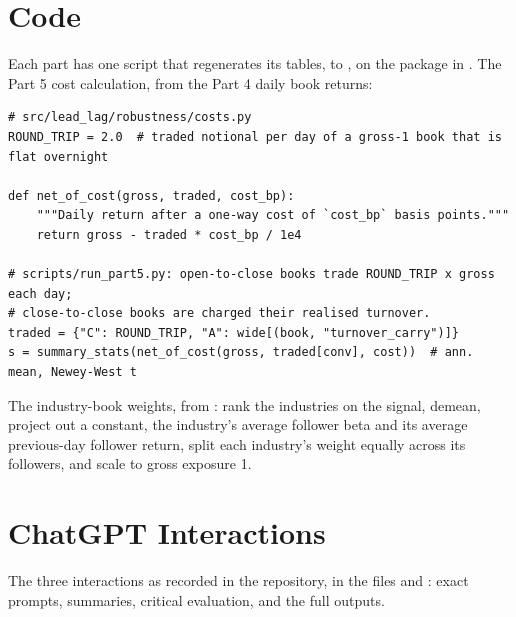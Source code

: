 \clearpage
\section{Code}\label{app:code}

Each part has one script that regenerates its tables,
 to , on the package in
. The Part 5 cost calculation, from the Part 4 daily book
returns:

\begin{Verbatim}[fontsize=\footnotesize,frame=single,framesep=6pt]
# src/lead_lag/robustness/costs.py
ROUND_TRIP = 2.0  # traded notional per day of a gross-1 book that is flat overnight

def net_of_cost(gross, traded, cost_bp):
    """Daily return after a one-way cost of `cost_bp` basis points."""
    return gross - traded * cost_bp / 1e4

# scripts/run_part5.py: open-to-close books trade ROUND_TRIP x gross each day;
# close-to-close books are charged their realised turnover.
traded = {"C": ROUND_TRIP, "A": wide[(book, "turnover_carry")]}
s = summary_stats(net_of_cost(gross, traded[conv], cost))  # ann. mean, Newey-West t
\end{Verbatim}

The industry-book weights, from
: rank the industries on the
signal, demean, project out a constant, the industry's average follower beta
and its average previous-day follower return, split each industry's weight
equally across its followers, and scale to gross exposure 1.

\clearpage
\section{ChatGPT Interactions}\label{app:chatgpt}

The three interactions as recorded in the repository, in the files
 and : exact prompts,
summaries, critical evaluation, and the full outputs.
\sloppy



\clearpage


